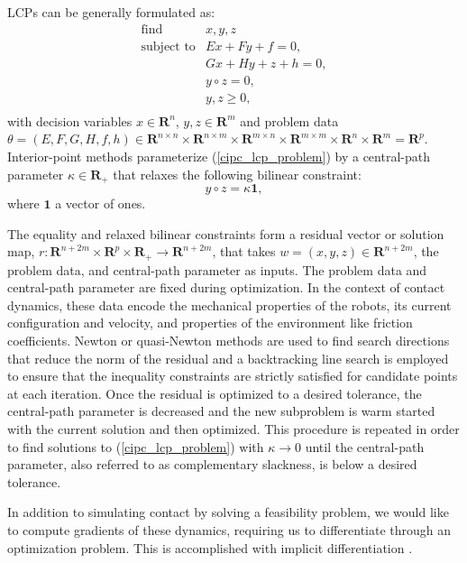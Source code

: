 LCPs can be generally formulated as:
\begin{equation}
	\begin{array}{ll}
		\mbox{find}       & x, y, z \\
		\mbox{subject to} & E x + F y + f = 0,\\
		& G x + H y + z + h = 0,\\
		& y \circ z = 0,\\
		& y, z \geq 0,\\
	\end{array} \label{cipc_lcp_problem}
\end{equation}
with decision variables $x \in \mathbf{R}^n$, $y, z \in \mathbf{R}^m$ and problem data $\theta = (E, F, G, H, f, h)  \in \mathbf{R}^{n \times n} \times \mathbf{R}^{n \times m} \times \mathbf{R}^{m \times n} \times \mathbf{R}^{m \times m} \times \mathbf{R}^n \times \mathbf{R}^m = \mathbf{R}^p$. Interior-point methods parameterize (\ref{cipc_lcp_problem}) by a  central-path parameter $\kappa \in \mathbf{R}_{+}$ that relaxes the following bilinear constraint:
\begin{equation}
	y \circ z = \kappa \textbf{1},
\end{equation}
where $\textbf{1}$ a vector of ones. 

The equality and relaxed bilinear constraints form a residual vector or solution map, $r: \mathbf{R}^{n + 2m} \times \mathbf{R}^p  \times \mathbf{R}_{+} \rightarrow \mathbf{R}^{n + 2m}$, that takes $w = (x, y, z) \in \mathbf{R}^{n + 2m}$, the problem data, and central-path parameter as inputs. The problem data and central-path parameter are fixed during optimization. In the context of contact dynamics, these data encode the mechanical properties of the robots, its current configuration and velocity, and properties of the environment like friction coefficients.
Newton or quasi-Newton methods are used to find search directions that reduce the norm of the residual and a backtracking line search is employed to ensure that the inequality constraints are strictly satisfied for candidate points at each iteration. Once the residual is optimized to a desired tolerance, the central-path parameter is decreased and the new subproblem is warm started with the current solution and then optimized. This procedure is repeated in order to find solutions to (\ref{cipc_lcp_problem}) with $\kappa \rightarrow 0$ until the central-path parameter, also referred to as complementary slackness, is below a desired tolerance.

In addition to simulating contact by solving a feasibility problem, we would like to compute gradients of these dynamics, requiring us to differentiate through an optimization problem. This is accomplished with implicit differentiation \cite{dini1907lezioni}.

